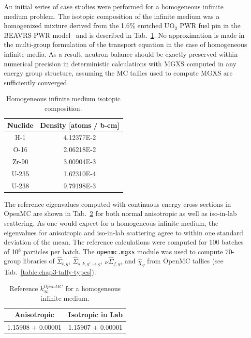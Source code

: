 An initial series of case studies were performed for a homogeneous infinite medium problem. The isotopic composition of the infinite medium was a homogenized mixture derived from the 1.6\% enriched UO$_2$ \ac{PWR} fuel pin in the \ac{BEAVRS} \ac{PWR} model~\cite{horelik2013beavrs} and is described in Tab.~\ref{table:chap5-inf-med-isotopes}. No approximation is made in the multi-group formulation of the transport equation in the case of homogeneous infinite media. As a result, neutron balance should be exactly preserved within numerical precision in deterministic calculations with \ac{MGXS} computed in any energy group structure, assuming the \ac{MC} tallies used to compute \ac{MGXS} are sufficiently converged.

\begin{table}[h!]
  \centering
  \caption[Infinite medium isotopic composition]{Homogeneous infinite medium isotopic composition.}
  \small
  \label{table:chap5-inf-med-isotopes} 
  \vspace{6pt}
  \begin{tabular}{c c}
  \toprule
  \rowcolor{lightgray}
  {\bf Nuclide} &
  {\bf Density [atoms / b-cm]} \\
  \midrule
  H-1 &   4.12377E-2 \\
  O-16 &  2.06218E-2 \\
  Zr-90 & 3.00904E-3 \\
  U-235 & 1.62310E-4 \\
  U-238 & 9.79198E-3 \\
  \bottomrule
\end{tabular}
\end{table}

The reference eigenvalues computed with continuous energy cross sections in OpenMC are shown in Tab.~\ref{table:chap5-inf-med-reference} for both normal anisotropic as well as iso-in-lab scattering. As one would expect for a homogeneous infinite medium, the eigenvalues for anisotropic and iso-in-lab scattering agree to within one standard deviation of the mean. The reference calculations were computed for 100 batches of 10$^{8}$ particles per batch. The \texttt{openmc.mgxs} module was used to compute 70-group libraries of $\hat{\Sigma}_{t,g}$, $\hat{\Sigma}_{s,k,g'\rightarrow g}$, $\nu\hat{\Sigma}_{f,g}$, and $\hat{\chi}_{g}$ from OpenMC tallies (see Tab.~\ref{table:chap3-tally-types}).

\begin{table}[h!]
  \centering
  \caption[Reference OpenMC eigenvalues for an infinite medium]{Reference $k^{OpenMC}_{\infty}$ for a homogeneous infinite medium.}
  \small
  \label{table:chap5-inf-med-reference} 
  \vspace{6pt}
  \begin{tabular}{c c}
  \toprule
  \rowcolor{lightgray}
  {\cellcolor{carolinablue} {\bf Anisotropic}} &
  {\cellcolor{lightgreen} {\bf Isotropic in Lab}} \\
  \midrule
  1.15908 $\pm$ 0.00001 & 1.15907 $\pm$ 0.00001 \\
  \bottomrule
\end{tabular}
\end{table}

